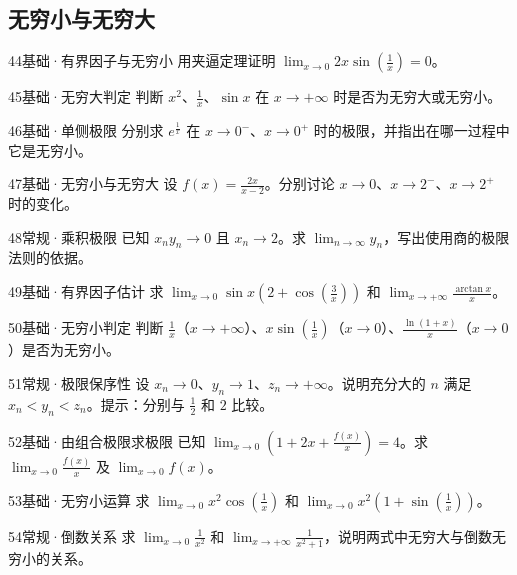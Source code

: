 \subsection{无穷小与无穷大}
\begin{exercise}{44}{基础·有界因子与无穷小}
用夹逼定理证明 $\lim_{x\to0}2x\sin(\frac{1}{x})=0$。
\end{exercise}
\begin{exercise}{45}{基础·无穷大判定}
判断 $x^2$、$\frac{1}{x}$、$\sin x$ 在 $x\to+\infty$ 时是否为无穷大或无穷小。
\end{exercise}
\begin{exercise}{46}{基础·单侧极限}
分别求 $e^{\frac{1}{x}}$ 在 $x\to0^-$、$x\to0^+$ 时的极限，并指出在哪一过程中它是无穷小。
\end{exercise}
\begin{exercise}{47}{基础·无穷小与无穷大}
设 $f(x)=\frac{2x}{x-2}$。分别讨论 $x\to0$、$x\to2^-$、$x\to2^+$ 时的变化。
\end{exercise}
\begin{exercise}{48}{常规·乘积极限}
已知 $x_ny_n\to0$ 且 $x_n\to2$。求 $\lim_{n\to\infty}y_n$，写出使用商的极限法则的依据。
\end{exercise}
\begin{exercise}{49}{基础·有界因子估计}
求 $\lim_{x\to0}\sin x(2+\cos(\frac{3}{x}))$ 和 $\lim_{x\to+\infty}\frac{\arctan x}{x}$。
\end{exercise}
\begin{exercise}{50}{基础·无穷小判定}
判断 $\frac{1}{x}$（$x\to+\infty$）、$x\sin(\frac{1}{x})$（$x\to0$）、$\frac{\ln(1+x)}{x}$（$x\to0$）是否为无穷小。
\end{exercise}
\begin{exercise}{51}{常规·极限保序性}
设 $x_n\to0$、$y_n\to1$、$z_n\to+\infty$。说明充分大的 $n$ 满足 $x_n<y_n<z_n$。提示：分别与 $\frac{1}{2}$ 和 $2$ 比较。
\end{exercise}
\begin{exercise}{52}{基础·由组合极限求极限}
已知 $\lim_{x\to0}(1+2x+\frac{f(x)}{x})=4$。求 $\lim_{x\to0}\frac{f(x)}{x}$ 及 $\lim_{x\to0}f(x)$。
\end{exercise}
\begin{exercise}{53}{基础·无穷小运算}
求 $\lim_{x\to0}x^2\cos(\frac{1}{x})$ 和 $\lim_{x\to0}x^2(1+\sin(\frac{1}{x}))$。
\end{exercise}
\begin{exercise}{54}{常规·倒数关系}
求 $\lim_{x\to0}\frac{1}{x^2}$ 和 $\lim_{x\to+\infty}\frac{1}{x^2+1}$，说明两式中无穷大与倒数无穷小的关系。
\end{exercise}
